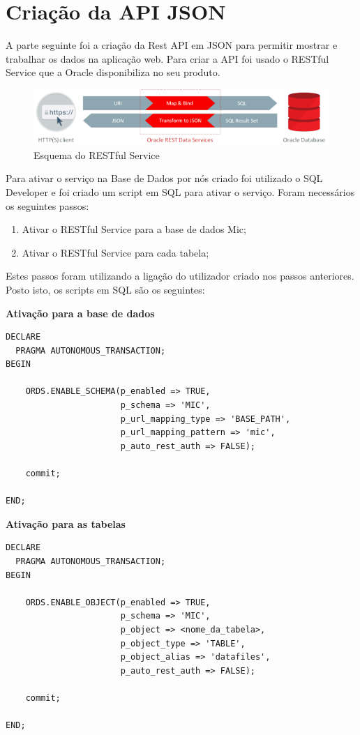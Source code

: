 \chapter*{Criação da API JSON}\label{sec:parte3}

A parte seguinte foi a criação da Rest API em JSON para permitir mostrar e trabalhar os dados na aplicação web.
\newline Para criar a API foi usado o RESTful Service que a Oracle disponibiliza no seu produto.

\begin{figure}[h!]
 \includegraphics[width=\linewidth]{tex/figs/3606406.png}
    \caption{Esquema do RESTful Service} 
    \label{fig:esquemarest}
\end{figure}

Para ativar o serviço na Base de Dados por nós criado foi utilizado o SQL Developer e foi criado um script em SQL para ativar o serviço.
\newline Foram necessários os seguintes passos:
\begin{enumerate}
    \item Ativar o RESTful Service para a base de dados Mic;
    \item Ativar o RESTful Service para cada tabela;
\end{enumerate}
Estes passos foram utilizando a ligação do utilizador criado nos passos anteriores.
Posto isto, os scripts em SQL são os seguintes:


\textbf{Ativação para a base de dados}
\begin{lstlisting}
DECLARE
  PRAGMA AUTONOMOUS_TRANSACTION;
BEGIN

    ORDS.ENABLE_SCHEMA(p_enabled => TRUE,
                       p_schema => 'MIC',
                       p_url_mapping_type => 'BASE_PATH',
                       p_url_mapping_pattern => 'mic',
                       p_auto_rest_auth => FALSE);

    commit;

END;
\end{lstlisting}

\textbf{Ativação para as tabelas}
\begin{lstlisting}
DECLARE
  PRAGMA AUTONOMOUS_TRANSACTION;
BEGIN

    ORDS.ENABLE_OBJECT(p_enabled => TRUE,
                       p_schema => 'MIC',
                       p_object => <nome_da_tabela>,
                       p_object_type => 'TABLE',
                       p_object_alias => 'datafiles',
                       p_auto_rest_auth => FALSE);

    commit;

END;
\end{lstlisting}

